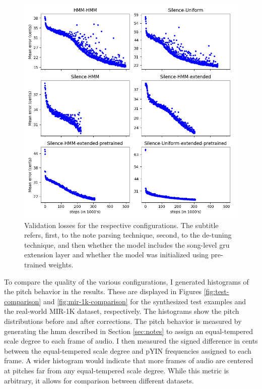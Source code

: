 \begin{figure}[t]
    \centering
    \includegraphics[width=\columnwidth]{figures/losses_plots.png}
    \caption{Validation losses for the respective configurations. The subtitle refers, first, to the note parsing technique, second, to the de-tuning technique, and then whether the model includes the song-level \gls{gru} extension layer and whether the model was initialized using pre-trained weights.}
    \label{fig:losses_plots}
\end{figure}

To compare the quality of the various configurations, I generated histograms of the pitch behavior in the results. These are displayed in Figures \ref{fig:test-comparison} and \ref{fig:mir-1k-comparison} for the synthesized test examples and the real-world MIR-1K dataset, respectively. The histograms show the pitch distributions before and after corrections. The pitch behavior is measured by generating the \gls{hmm} described in Section \ref{sec:notes} to assign an equal-tempered scale degree to each frame of audio. I then measured the signed difference in cents between the equal-tempered scale degree and pYIN frequencies assigned to each frame. A wider histogram would indicate that more frames of audio are centered at pitches far from any equal-tempered scale degree. While this metric is arbitrary, it allows for comparison between different datasets.

